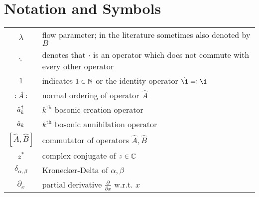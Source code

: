 \chapter*{Notation and Symbols}
\begin{tabular}{cp{}}
  $\lambda$ & flow parameter; in the literature sometimes also denoted by $B$ \\
  $\hat\cdot$ & denotes that $\cdot$ is an operator which does not commute with every other operator\\
  $1$ & indicates $1\in\mathbb{N}$ or the identity operator $\hat{\1}\eqdef \1$\\
  $\vcentcolon \hat A\vcentcolon$ & normal ordering of operator $\hat A$\\ 
  $\hat a^\dagger_k$ & $k^\mathrm{th}$ bosonic creation operator \\
  $\hat a_k$ & $k^\mathrm{th}$ bosonic annihilation operator \\
  $[\hat{ A},\hat{ B}]$ & commutator of operators $\hat{ A},\hat{ B}$ \\
  $z^*$ & complex conjugate of $z\in\mathbb{C}$ \\
  $\delta_{\alpha,\beta}$ & Kronecker-Delta of $\alpha,\beta$ \\ 
  $\partial_x$ & partial derivative $\frac{\partial}{\partial x}$ w.r.t. $x$\\

\end{tabular}\\







